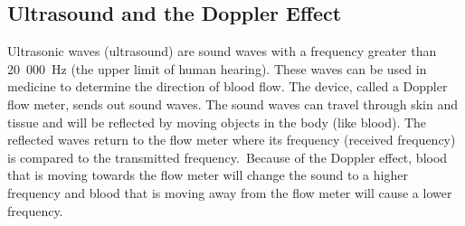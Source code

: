 \subsection{Ultrasound and the Doppler Effect}
Ultrasonic waves (ultrasound) are sound waves with a frequency greater than 20~000~Hz (the upper limit of human hearing). These waves can be used in medicine to determine the direction of blood flow. The device, called a Doppler flow meter, sends out sound waves. The sound waves can travel through skin and tissue and will be reflected by moving objects in the body (like blood). The reflected waves return to the flow meter where its frequency (received frequency) is compared to the transmitted frequency.\
Because of the Doppler effect, blood that is moving towards the flow meter will change the sound to a higher frequency and blood that is moving away from the flow meter will cause a lower frequency.
